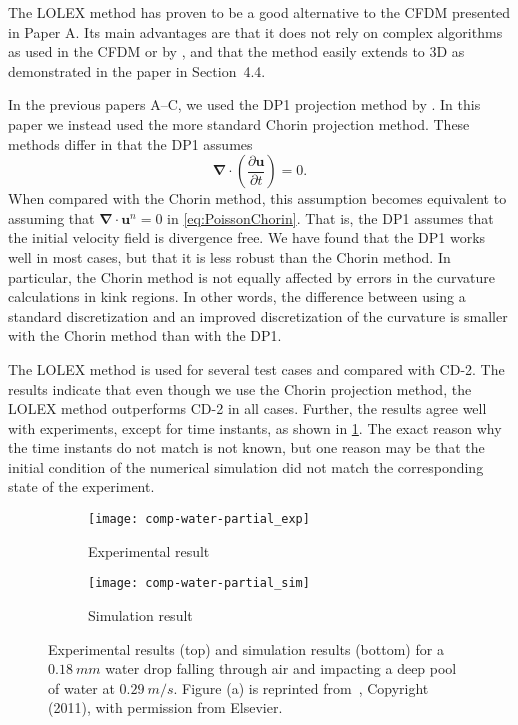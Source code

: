 \documentclass[11pt,b5paper,DIV=calc,BCOR1.3cm,headings=small,%
               footinclude=false,headsepline]{scrbook}
\newcommand*{\pdt}[1]{\ensuremath{\frac{\partial #1}{\partial t}}}
\newcommand*{\vct}[1]{\ensuremath{\boldsymbol{#1}}}
\newcommand*{\del}{\boldsymbol\nabla}
\renewcommand*{\div}{\del\cdot}
\begin{document}
The LOLEX method has proven to be a good alternative to the CFDM presented in
Paper A.  Its main advantages are that it does not rely on complex algorithms
as used in the CFDM or by \citet{Macklin06}, and that the method easily extends
to 3D as demonstrated in the paper in Section~4.4.

In the previous papers A--C, we used the DP1 projection method by
\citet{Hansen05}.  In this paper we instead used the more standard Chorin
projection method.  These methods differ in that the DP1 assumes
\begin{equation}
  \div\left(\pdt{\vct u}\right) = 0.
\end{equation}
When compared with the Chorin method, this assumption becomes equivalent to
assuming that $\div\vct u^{n} = 0$ in \eqref{eq:PoissonChorin}.  That is, the
DP1 assumes that the initial velocity field is divergence free.  We have found
that the DP1 works well in most cases, but that it is less robust than the
Chorin method.  In particular, the Chorin method is not equally affected by
errors in the curvature calculations in kink regions.  In other words, the
difference between using a standard discretization and an improved
discretization of the curvature is smaller with the Chorin method than with the
DP1.

The LOLEX method is used for several test cases and compared with CD-2.  The
results indicate that even though we use the Chorin projection method, the
LOLEX method outperforms CD-2 in all cases.  Further, the results agree well
with experiments, except for time instants, as shown in \cref{fig:D2}.  The
exact reason why the time instants do not match is not known, but one reason
may be that the initial condition of the numerical simulation did not match the
corresponding state of the experiment.
\begin{figure}[tbp]
  \centering
  \begin{subfigure}[t]{\textwidth}
    \centering
    \texttt{[image: comp-water-partial\_exp]}
    \caption{Experimental result}
  \end{subfigure}
  \begin{subfigure}[t]{\textwidth}
    \centering
    \texttt{[image: comp-water-partial\_sim]}
    \caption{Simulation result}
  \end{subfigure}
  \caption{Experimental results (top) and simulation results (bottom) for
    a $\SI{0.18}{mm}$ water drop falling through air and impacting a deep
    pool of water at $\SI{0.29}{m/s}$.  Figure (a) is reprinted
    from~\cite{Zhao11}, Copyright (2011), with permission from Elsevier.}
  \label{fig:D2}
\end{figure}
\end{document}
